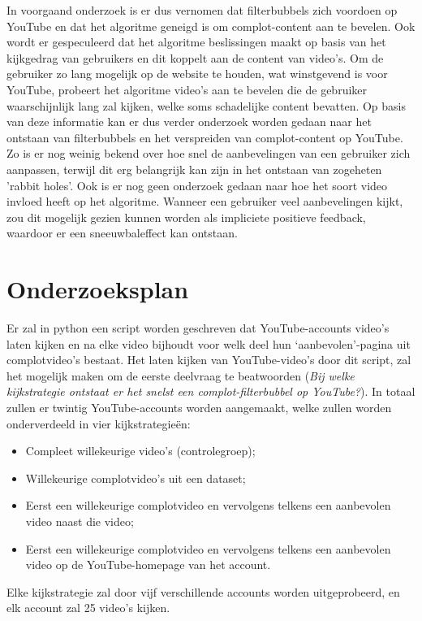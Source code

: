 \documentclass{uva-inf-article}
\begin{document}
In voorgaand onderzoek is er dus vernomen dat filterbubbels zich voordoen op YouTube en dat het algoritme geneigd is om complot-content aan te bevelen. Ook wordt er gespeculeerd dat het algoritme beslissingen maakt op basis van het kijkgedrag van gebruikers en dit koppelt aan de content van video's. Om de gebruiker zo lang mogelijk op de website te houden, wat winstgevend is voor YouTube, probeert het algoritme video's aan te bevelen die de gebruiker waarschijnlijk lang zal kijken, welke soms schadelijke content bevatten. Op basis van deze informatie kan er dus verder onderzoek worden gedaan naar het ontstaan van filterbubbels en het verspreiden van complot-content op YouTube. Zo is er nog weinig bekend over hoe snel de aanbevelingen van een gebruiker zich aanpassen, terwijl dit erg belangrijk kan zijn in het ontstaan van zogeheten 'rabbit holes'. Ook is er nog geen onderzoek gedaan naar hoe het soort video invloed heeft op het algoritme. Wanneer een gebruiker veel aanbevelingen kijkt, zou dit mogelijk gezien kunnen worden als impliciete positieve feedback, waardoor er een sneeuwbaleffect kan ontstaan. 

\section{Onderzoeksplan}
Er zal in python een script worden geschreven dat YouTube-accounts video’s laten kijken en na elke video bijhoudt voor welk deel hun ‘aanbevolen’-pagina uit complotvideo’s bestaat. Het laten kijken van YouTube-video's door dit script, zal het mogelijk maken om de eerste deelvraag te beatwoorden (\textit{Bij welke kijkstrategie ontstaat er het snelst een complot-filterbubbel op YouTube?}). In totaal zullen er twintig YouTube-accounts worden aangemaakt, welke zullen worden onderverdeeld in vier kijkstrategieën:

\begin{itemize}
    \item Compleet willekeurige video’s (controlegroep);
    \item Willekeurige complotvideo’s uit een dataset;
    \item Eerst een willekeurige complotvideo en vervolgens telkens een aanbevolen video naast die video;
    \item Eerst een willekeurige complotvideo en vervolgens telkens een aanbevolen video op de YouTube-homepage van het account.
\end{itemize}

\noindent Elke kijkstrategie zal door vijf verschillende accounts worden uitgeprobeerd, en elk account zal 25 video’s kijken.   
\end{document}
